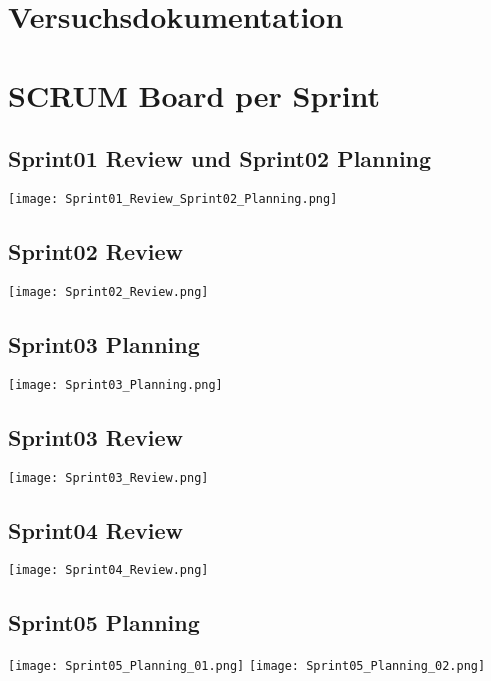 \chapter{Versuchsdokumentation}
\label{app:ch:versuche}

\chapter{SCRUM Board per Sprint}

\begin{landscape}
	\section*{Sprint01 Review und Sprint02 Planning}
	\texttt{[image: Sprint01\_Review\_Sprint02\_Planning.png]}
\end{landscape}

\newpage
\section*{Sprint02 Review}
\texttt{[image: Sprint02\_Review.png]}

\newpage
\begin{landscape}
	\section*{Sprint03 Planning}
	\texttt{[image: Sprint03\_Planning.png]}
\end{landscape}

\newpage
\section*{Sprint03 Review}
\texttt{[image: Sprint03\_Review.png]}

\newpage
\begin{landscape}
	\section*{Sprint04 Review}
	\texttt{[image: Sprint04\_Review.png]}
\end{landscape}

\newpage
\section*{Sprint05 Planning}
\texttt{[image: Sprint05\_Planning\_01.png]}
\newpage
\noindent
\texttt{[image: Sprint05\_Planning\_02.png]}

